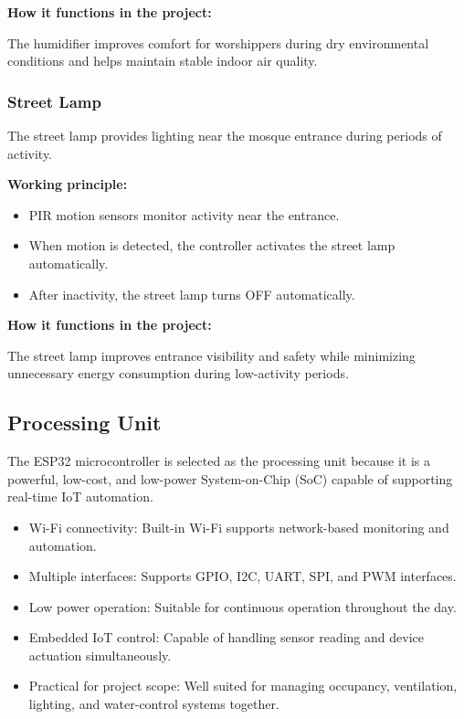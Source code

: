 \textbf{How it functions in the project:}

The humidifier improves comfort for worshippers during dry environmental conditions and helps maintain stable indoor air quality.


\subsubsection{Street Lamp}

The street lamp provides lighting near the mosque entrance during periods of activity.

\textbf{Working principle:}
\begin{itemize}
    \item PIR motion sensors monitor activity near the entrance.
    \item When motion is detected, the controller activates the street lamp automatically.
    \item After inactivity, the street lamp turns OFF automatically.
\end{itemize}

\textbf{How it functions in the project:}

The street lamp improves entrance visibility and safety while minimizing unnecessary energy consumption during low-activity periods.


\subsection{Processing Unit}

The ESP32 microcontroller is selected as the processing unit because it is a powerful, low-cost, and low-power System-on-Chip (SoC) capable of supporting real-time IoT automation.

\begin{itemize}
    \item Wi-Fi connectivity: Built-in Wi-Fi supports network-based monitoring and automation.
    \item Multiple interfaces: Supports GPIO, I2C, UART, SPI, and PWM interfaces.
    \item Low power operation: Suitable for continuous operation throughout the day.
    \item Embedded IoT control: Capable of handling sensor reading and device actuation simultaneously.
    \item Practical for project scope: Well suited for managing occupancy, ventilation, lighting, and water-control systems together.
\end{itemize}

